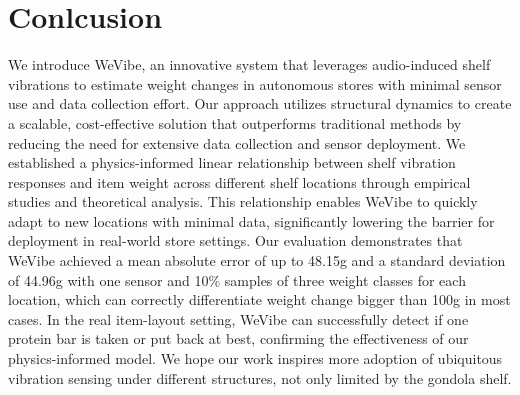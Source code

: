 \section{Conlcusion}
\label{sec:Conlcusion}
We introduce WeVibe, an innovative system that leverages audio-induced shelf vibrations to estimate weight changes in autonomous stores with minimal sensor use and data collection effort. Our approach utilizes structural dynamics to create a scalable, cost-effective solution that outperforms traditional methods by reducing the need for extensive data collection and sensor deployment. We established a physics-informed linear relationship between shelf vibration responses and item weight across different shelf locations through empirical studies and theoretical analysis. This relationship enables WeVibe to quickly adapt to new locations with minimal data, significantly lowering the barrier for deployment in real-world store settings. Our evaluation demonstrates that WeVibe achieved a mean absolute error of up to 48.15g and a standard deviation of 44.96g with one sensor and 10\% samples of three weight classes for each location, which can correctly differentiate weight change bigger than 100g in most cases. In the real item-layout setting, WeVibe can successfully detect if one protein bar is taken or put back at best, confirming the effectiveness of our physics-informed model. We hope our work inspires more adoption of ubiquitous vibration sensing under different structures, not only limited by the gondola shelf.